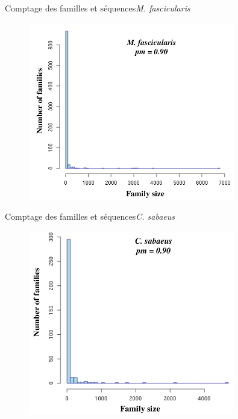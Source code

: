 \documentclass[11pt]{beamer}
\begin{document}
\begin{frame}{Comptage des familles et séquences}{\textit{M. fascicularis}}
\begin{figure}
	\includegraphics[width=0.8\textwidth]
		{img/Mf_hist_family_distribution_pm090.png}
	\end{figure}	  
\end{frame}
\begin{frame}{Comptage des familles et séquences}{\textit{C. sabaeus}}
\begin{figure}
	\includegraphics[width=0.8\textwidth]
		{img/Csa_hist_family_distribution_pm090.png}
	\end{figure}	  
\end{frame}
\end{document}

